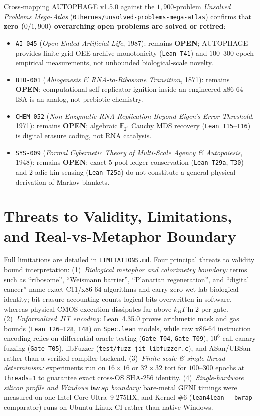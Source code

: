 \documentclass[11pt,reqno]{amsart}
\theoremstyle{plain}
\theoremstyle{definition}
\theoremstyle{remark}
\newcommand{\code}[1]{{\footnotesize\nolinkurl{#1}}}
\newcommand{\tcode}[1]{{\scriptsize\nolinkurl{#1}}}
\begin{document}
Cross-mapping AUTOPHAGE v1.5.0 against the $1{,}900$-problem \emph{Unsolved Problems Mega-Atlas} (\code{0thernes/unsolved-problems-mega-atlas}) confirms that \textbf{zero ($0 / 1{,}900$) overarching open problems are solved or retired}:
\begin{itemize}[leftmargin=1.5em,itemsep=2pt]
  \item \code{AI-045} (\emph{Open-Ended Artificial Life}, 1987): remains \textbf{OPEN}; AUTOPHAGE provides finite-grid OEE archive monotonicity (\code{Lean T41}) and $100$--$300$-epoch empirical measurements, not unbounded biological-scale novelty.
  \item \code{BIO-001} (\emph{Abiogenesis \& RNA-to-Ribosome Transition}, 1871): remains \textbf{OPEN}; computational self-replicator ignition inside an engineered x86-64 ISA is an analog, not prebiotic chemistry.
  \item \code{CHEM-052} (\emph{Non-Enzymatic RNA Replication Beyond Eigen's Error Threshold}, 1971): remains \textbf{OPEN}; algebraic $\mathbb{F}_{2^8}$ Cauchy MDS recovery (\code{Lean T15}--\code{T16}) is digital erasure coding, not RNA catalysis.
  \item \code{SYS-009} (\emph{Formal Cybernetic Theory of Multi-Scale Agency \& Autopoiesis}, 1948): remains \textbf{OPEN}; exact $5$-pool ledger conservation (\code{Lean T29a}, \code{T30}) and $2$-adic kin sensing (\code{Lean T25a}) do not constitute a general physical derivation of Markov blankets.
\end{itemize}

\section{Threats to Validity, Limitations, and Real-vs-Metaphor Boundary}
\label{sec:limits}

Full limitations are detailed in \code{LIMITATIONS.md}. Four principal threats to validity bound interpretation: (1)~\emph{Biological metaphor and calorimetry boundary:} terms such as ``ribosome'', ``Weismann barrier'', ``Planarian regeneration'', and ``digital cancer'' name exact C11/x86-64 algorithms and carry zero wet-lab biological identity; bit-erasure accounting counts logical bits overwritten in software, whereas physical CMOS execution dissipates far above $k_B T \ln 2$ per gate. (2)~\emph{Unformalized JIT encoding:} Lean~4.35.0 proves arithmetic mask and gas bounds (\code{Lean T26}--\code{T28}, \code{T48}) on \code{Spec.lean} models, while raw x86-64 instruction encoding relies on differential oracle testing (\code{Gate T04}, \code{Gate T09}), $10^6$-call canary fuzzing (\code{Gate T05}), libFuzzer (\code{test/fuzz_jit_libfuzzer.c}), and ASan/UBSan rather than a verified compiler backend. (3)~\emph{Finite scale \& single-thread determinism:} experiments run on $16\times 16$ or $32\times 32$ tori for $100$--$300$ epochs at \code{threads=1} to guarantee exact cross-OS SHA-256 identity. (4)~\emph{Single-hardware silicon profile and Windows \tcode{bwrap} boundary:} bare-metal GFNI timings were measured on one Intel Core Ultra~9 275HX, and Kernel \#6 (\code{lean4lean} + \code{bwrap} comparator) runs on Ubuntu Linux CI rather than native Windows.
\end{document}
